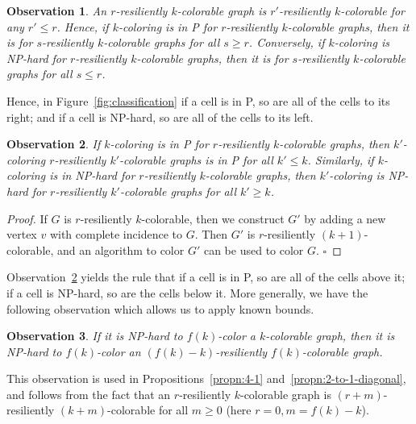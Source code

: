 \documentclass{llncs}
\newtheorem{obs}{Observation}
\begin{document}
\begin{obs}\label{obs:horizontal}
An $r$-resiliently $k$-colorable graph is $r'$-resiliently $k$-colorable for
any $r' \leq r$. Hence, if $k$-coloring is in P for $r$-resiliently
$k$-colorable graphs, then it is for $s$-resiliently $k$-colorable graphs for
all $s \geq r$.  Conversely, if $k$-coloring is NP-hard for $r$-resiliently
$k$-colorable graphs, then it is for $s$-resiliently $k$-colorable graphs for
all $s \leq r$. 
\end{obs}

Hence, in Figure~\ref{fig:classification} if a cell is in P, so are all of the
cells to its right; and if a cell is NP-hard, so are all of the cells to its
left. 

\begin{obs}\label{obs:vertical}
If $k$-coloring is in P for $r$-resiliently $k$-colorable graphs, then
$k'$-coloring $r$-resiliently $k'$-colorable graphs is in P for all $k' \leq
k$. Similarly, if $k$-coloring is in NP-hard for $r$-resiliently $k$-colorable
graphs, then $k'$-coloring is NP-hard for $r$-resiliently $k'$-colorable graphs
for all $k' \geq k$.
\end{obs}
\begin{proof}
If $G$ is $r$-resiliently $k$-colorable, then we construct $G'$ by adding a
new vertex $v$ with complete incidence to $G$. Then $G'$ is $r$-resiliently
$(k+1)$-colorable, and an algorithm to color $G'$ can be used to color $G$.
\hfill $\square$
\end{proof}

Observation~\ref{obs:vertical} yields the rule that if a cell is in P, so are
all of the cells above it; if a cell is NP-hard, so are the cells below it.
More generally, we have the following observation which allows us to apply
known bounds.

\begin{obs}\label{obs:function-bound}
If it is NP-hard to $f(k)$-color a $k$-colorable graph, then it is NP-hard to
$f(k)$-color an $(f(k)-k)$-resiliently $f(k)$-colorable graph.
\end{obs}

This observation is used in Propositions~\ref{propn:4-1}
and~\ref{propn:2-to-1-diagonal}, and follows from the fact that an
$r$-resiliently $k$-colorable graph is $(r+m)$-resiliently $(k+m)$-colorable
for all $m \geq 0$ (here $r = 0, m = f(k) - k$). 
\end{document}
